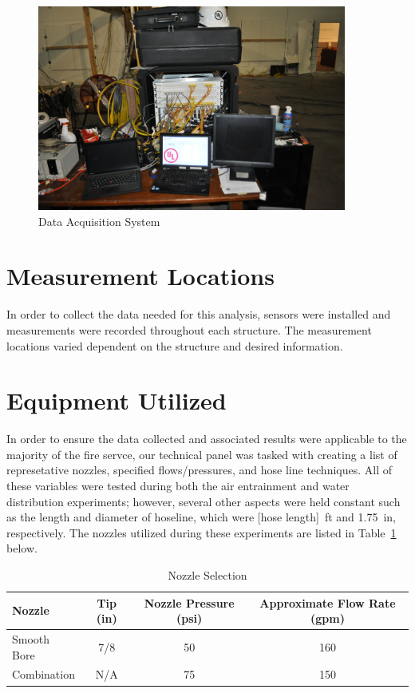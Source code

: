\documentclass[12pt,oneside]{book}
\begin{document}
\begin{figure}[H]
	\centering
	\includegraphics[width = 4in]{0_Images/Instrumentation/DataSystem.jpg}
	\caption{Data Acquisition System}
	\label{fig:DataSystem}
\end{figure}

\clearpage

\section{Measurement Locations}

In order to collect the data needed for this analysis, sensors were installed and measurements were recorded throughout each structure. The measurement locations varied dependent on the structure and desired information.

\clearpage

\section{Equipment Utilized}

In order to ensure the data collected and associated results were applicable to the majority of the fire servce, our technical panel was tasked with creating a list of represetative nozzles, specified flows/pressures, and hose line techniques. All of these variables were tested during both the air entrainment and water distribution experiments; however, several other aspects were held constant such as the length and diameter of hoseline, which were [hose length]~ft and 1.75~in, respectively. The nozzles utilized during these experiments are listed in Table~\ref{table:nozzle_selection} below.

\begin{table}[H]
\caption{Nozzle Selection }
\centering
\begin{tabular}{|l|c|c|c|}
\hline
Nozzle 		& Tip (in) 	& Nozzle Pressure (psi)	& Approximate Flow Rate (gpm) \\ \hline \hline
Smooth Bore & 	7/8 	& 	50 					& 160 \\ \hline
Combination & 	N/A 	& 	75 					& 150 \\ \hline
\end{tabular}
\label{table:nozzle_selection}
\end{table}
\end{document}
